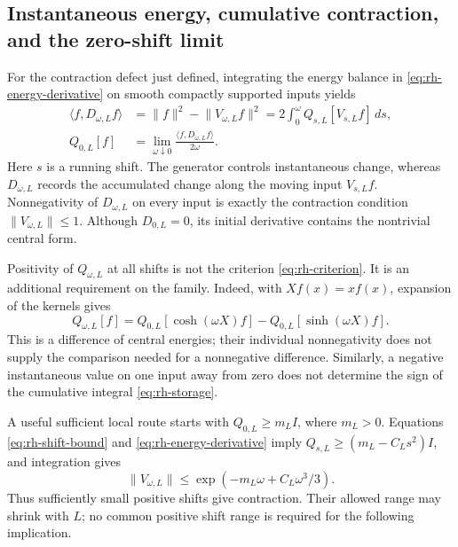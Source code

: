 \subsection{Instantaneous energy, cumulative contraction, and the zero-shift limit}
\label{subsec:rh-contraction}

For the contraction defect just defined, integrating the energy
balance in \eqref{eq:rh-energy-derivative} on smooth compactly
supported inputs yields
\begin{align}
\langle f,D_{\omega,L}f\rangle
&=\lVert f\rVert^2-\lVert V_{\omega,L}f\rVert^2
=2\int_0^\omega Q_{s,L}[V_{s,L}f]\,ds,
\label{eq:rh-storage}\\
Q_{0,L}[f]&=
\lim_{\omega\downarrow0}\frac{\langle f,D_{\omega,L}f\rangle}{2\omega}.
\label{eq:rh-central-limit}
\end{align}
Here $s$ is a running shift. The generator controls instantaneous
change, whereas $D_{\omega,L}$ records the accumulated change along
the moving input $V_{s,L}f$.
Nonnegativity of $D_{\omega,L}$ on every input is exactly the contraction
condition $\lVert V_{\omega,L}\rVert\leq1$. Although $D_{0,L}=0$,
its initial derivative contains the nontrivial central form.

Positivity of $Q_{\omega,L}$ at all shifts is not the criterion
\eqref{eq:rh-criterion}. It is an additional requirement on the family.
Indeed, with $Xf(x)=xf(x)$, expansion of the kernels gives
\begin{equation}
Q_{\omega,L}[f]
=Q_{0,L}[\cosh(\omega X)f]-Q_{0,L}[\sinh(\omega X)f].
\label{eq:rh-hyperbolic}
\end{equation}
This is a difference of central energies; their individual
nonnegativity does not supply the comparison needed for a nonnegative
difference. Similarly, a negative instantaneous value on one input
away from zero does not determine the sign of the cumulative integral
\eqref{eq:rh-storage}.

A useful sufficient local route starts with
$Q_{0,L}\geq m_LI$, where $m_L>0$. Equations
\eqref{eq:rh-shift-bound} and \eqref{eq:rh-energy-derivative} imply
$Q_{s,L}\geq(m_L-C_Ls^2)I$, and integration gives
\begin{equation}
\lVert V_{\omega,L}\rVert
\leq\exp(-m_L\omega+C_L\omega^3/3).
\label{eq:rh-small-contraction}
\end{equation}
Thus sufficiently small positive shifts give contraction.
Their allowed range may shrink with $L$; no common positive shift
range is required for the following implication.

